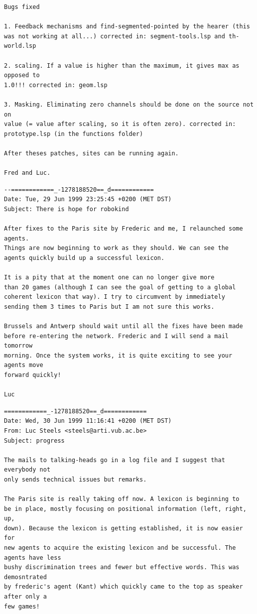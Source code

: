 {{\begin{verbatim}
Bugs fixed

1. Feedback mechanisms and find-segmented-pointed by the hearer (this
was not working at all...) corrected in: segment-tools.lsp and th-world.lsp

2. scaling. If a value is higher than the maximum, it gives max as opposed to
1.0!!! corrected in: geom.lsp

3. Masking. Eliminating zero channels should be done on the source not on
value (= value after scaling, so it is often zero). corrected in: 
prototype.lsp (in the functions folder)

After theses patches, sites can be running again.

Fred and Luc.
\end{verbatim}
\begin{verbatim}
--============_-1278188520==_d============
Date: Tue, 29 Jun 1999 23:25:45 +0200 (MET DST)
Subject: There is hope for robokind 

After fixes to the Paris site by Frederic and me, I relaunched some agents. 
Things are now beginning to work as they should. We can see the
agents quickly build up a successful lexicon.

It is a pity that at the moment one can no longer give more 
than 20 games (although I can see the goal of getting to a global 
coherent lexicon that way). I try to circumvent by immediately
sending them 3 times to Paris but I am not sure this works.

Brussels and Antwerp should wait until all the fixes have been made 
before re-entering the network. Frederic and I will send a mail tomorrow
morning. Once the system works, it is quite exciting to see your agents move 
forward quickly!

Luc
\end{verbatim}}

\footnotesize{
\begin{verbatim}
============_-1278188520==_d============
Date: Wed, 30 Jun 1999 11:16:41 +0200 (MET DST)
From: Luc Steels <steels@arti.vub.ac.be>
Subject: progress 

The mails to talking-heads go in a log file and I suggest that everybody not 
only sends technical issues but remarks.

The Paris site is really taking off now. A lexicon is beginning to 
be in place, mostly focusing on positional information (left, right, up, 
down). Because the lexicon is getting established, it is now easier for
new agents to acquire the existing lexicon and be successful. The agents have less
bushy discrimination trees and fewer but effective words. This was demosntrated
by frederic's agent (Kant) which quickly came to the top as speaker after only a
few games!


\end{verbatim}}}
